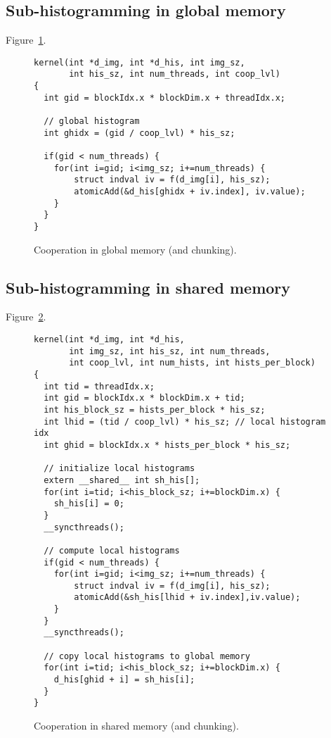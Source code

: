 \subsection{Sub-histogramming in global memory}

Figure~\ref{fig:coop_global}.
%
\begin{figure}
\begin{lstlisting}
kernel(int *d_img, int *d_his, int img_sz,
       int his_sz, int num_threads, int coop_lvl)
{
  int gid = blockIdx.x * blockDim.x + threadIdx.x;

  // global histogram
  int ghidx = (gid / coop_lvl) * his_sz;

  if(gid < num_threads) {
    for(int i=gid; i<img_sz; i+=num_threads) {
        struct indval iv = f(d_img[i], his_sz);
        atomicAdd(&d_his[ghidx + iv.index], iv.value);
    }
  }
}
\end{lstlisting}
\caption{Cooperation in global memory (and chunking).}
\label{fig:coop_global}
\end{figure}
%


\subsection{Sub-histogramming in shared memory}


Figure~\ref{fig:coop_shared}.
%
\begin{figure}
\begin{lstlisting}
kernel(int *d_img, int *d_his,
       int img_sz, int his_sz, int num_threads,
       int coop_lvl, int num_hists, int hists_per_block)
{
  int tid = threadIdx.x;
  int gid = blockIdx.x * blockDim.x + tid;
  int his_block_sz = hists_per_block * his_sz;
  int lhid = (tid / coop_lvl) * his_sz; // local histogram idx
  int ghid = blockIdx.x * hists_per_block * his_sz;

  // initialize local histograms
  extern __shared__ int sh_his[];
  for(int i=tid; i<his_block_sz; i+=blockDim.x) {
    sh_his[i] = 0;
  }
  __syncthreads();

  // compute local histograms
  if(gid < num_threads) {
    for(int i=gid; i<img_sz; i+=num_threads) {
        struct indval iv = f(d_img[i], his_sz);
        atomicAdd(&sh_his[lhid + iv.index],iv.value);
    }
  }
  __syncthreads();

  // copy local histograms to global memory
  for(int i=tid; i<his_block_sz; i+=blockDim.x) {
    d_his[ghid + i] = sh_his[i];
  }
}
\end{lstlisting}
\caption{Cooperation in shared memory (and chunking).}
\label{fig:coop_shared}
\end{figure}
%


